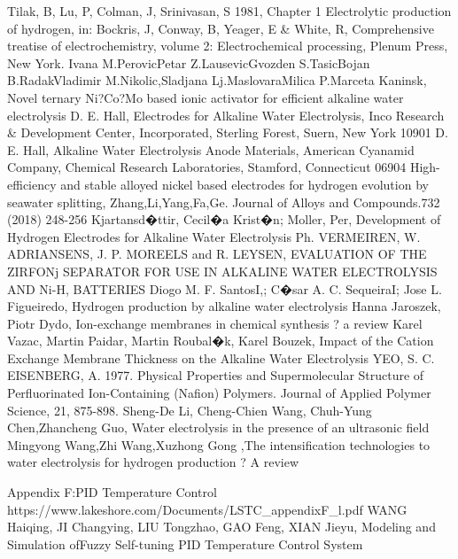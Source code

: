 \begin{thebibliography}{9}
Tilak, B, Lu, P, Colman, J,  Srinivasan, S 1981, Chapter 1  Electrolytic production of hydrogen, in: Bockris, J, Conway, B, Yeager, E \& White, R, Comprehensive treatise of electrochemistry, volume 2: Electrochemical processing, Plenum Press, New York.
Ivana M.PerovicPetar Z.LausevicGvozden S.TasicBojan B.RadakVladimir M.Nikolic,Sladjana Lj.MaslovaraMilica P.Marceta Kaninsk, Novel ternary Ni?Co?Mo based ionic activator for efficient alkaline water electrolysis
D. E. Hall, Electrodes for Alkaline Water Electrolysis, Inco Research \& Development Center, Incorporated, Sterling Forest, Suern, New York 10901
D. E. Hall, Alkaline Water Electrolysis Anode Materials, American Cyanamid Company, Chemical Research Laboratories, Stamford, Connecticut 06904
High-efficiency and stable alloyed nickel based electrodes for hydrogen evolution by seawater splitting, Zhang,Li,Yang,Fa,Ge. Journal of Alloys and Compounds.732 (2018) 248-256
Kjartansd�ttir, Cecil�a Krist�n; Moller, Per, Development of Hydrogen Electrodes for Alkaline Water Electrolysis
Ph. VERMEIREN, W. ADRIANSENS, J. P. MOREELS and R. LEYSEN,  EVALUATION OF THE ZIRFONj SEPARATOR FOR USE IN ALKALINE WATER ELECTROLYSIS AND Ni-H, BATTERIES
Diogo M. F. SantosI,; C�sar A. C. SequeiraI; Jose L. Figueiredo, Hydrogen production by alkaline water electrolysis
Hanna Jaroszek, Piotr Dydo, Ion-exchange membranes in chemical synthesis ? a review
Karel Vazac, Martin Paidar, Martin Roubal�k, Karel Bouzek, Impact of the Cation Exchange Membrane Thickness on the Alkaline Water Electrolysis
YEO, S. C.  EISENBERG, A. 1977. Physical Properties and Supermolecular Structure of Perfluorinated
Ion-Containing (Nafion) Polymers. Journal of Applied Polymer Science, 21, 875-898.
Sheng-De Li, Cheng-Chien Wang, Chuh-Yung Chen,Zhancheng Guo, Water electrolysis in the presence of an ultrasonic field
Mingyong Wang,Zhi Wang,Xuzhong Gong ,The intensification technologies to water electrolysis for hydrogen production ? A review

Appendix F:PID Temperature Control https://www.lakeshore.com/Documents/LSTC\_appendixF\_l.pdf
WANG Haiqing, JI Changying, LIU Tongzhao, GAO Feng, XIAN Jieyu, Modeling and Simulation ofFuzzy Self-tuning PID Temperature Control System





\end{thebibliography}
